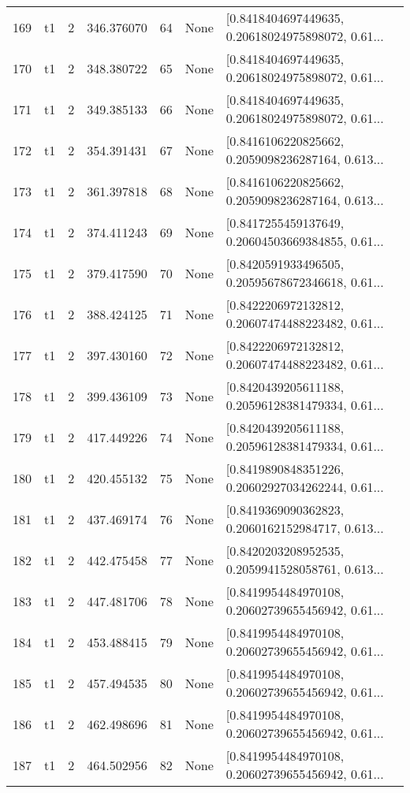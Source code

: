 \begin{tabular}{lllrlll}
169 &  t1 &   2 &  346.376070 &   64 &  None &  [0.8418404697449635, 0.20618024975898072, 0.61... \\
170 &  t1 &   2 &  348.380722 &   65 &  None &  [0.8418404697449635, 0.20618024975898072, 0.61... \\
171 &  t1 &   2 &  349.385133 &   66 &  None &  [0.8418404697449635, 0.20618024975898072, 0.61... \\
172 &  t1 &   2 &  354.391431 &   67 &  None &  [0.8416106220825662, 0.2059098236287164, 0.613... \\
173 &  t1 &   2 &  361.397818 &   68 &  None &  [0.8416106220825662, 0.2059098236287164, 0.613... \\
174 &  t1 &   2 &  374.411243 &   69 &  None &  [0.8417255459137649, 0.20604503669384855, 0.61... \\
175 &  t1 &   2 &  379.417590 &   70 &  None &  [0.8420591933496505, 0.20595678672346618, 0.61... \\
176 &  t1 &   2 &  388.424125 &   71 &  None &  [0.8422206972132812, 0.20607474488223482, 0.61... \\
177 &  t1 &   2 &  397.430160 &   72 &  None &  [0.8422206972132812, 0.20607474488223482, 0.61... \\
178 &  t1 &   2 &  399.436109 &   73 &  None &  [0.8420439205611188, 0.20596128381479334, 0.61... \\
179 &  t1 &   2 &  417.449226 &   74 &  None &  [0.8420439205611188, 0.20596128381479334, 0.61... \\
180 &  t1 &   2 &  420.455132 &   75 &  None &  [0.8419890848351226, 0.20602927034262244, 0.61... \\
181 &  t1 &   2 &  437.469174 &   76 &  None &  [0.8419369090362823, 0.2060162152984717, 0.613... \\
182 &  t1 &   2 &  442.475458 &   77 &  None &  [0.8420203208952535, 0.2059941528058761, 0.613... \\
183 &  t1 &   2 &  447.481706 &   78 &  None &  [0.8419954484970108, 0.20602739655456942, 0.61... \\
184 &  t1 &   2 &  453.488415 &   79 &  None &  [0.8419954484970108, 0.20602739655456942, 0.61... \\
185 &  t1 &   2 &  457.494535 &   80 &  None &  [0.8419954484970108, 0.20602739655456942, 0.61... \\
186 &  t1 &   2 &  462.498696 &   81 &  None &  [0.8419954484970108, 0.20602739655456942, 0.61... \\
187 &  t1 &   2 &  464.502956 &   82 &  None &  [0.8419954484970108, 0.20602739655456942, 0.61... \\

\end{tabular}
